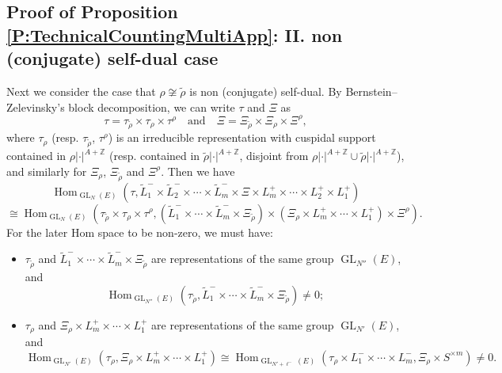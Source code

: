 \documentclass[11pt,letterpaper]{amsart}
\theoremstyle{plain}
\numberwithin{theorem}{section}
\numberwithin{equation}{subsection}
\theoremstyle{remark}
\newcommand{\Hom}{\operatorname{Hom}}
\newcommand{\GL}{\operatorname{GL}}
\newcommand{\Z}{\mathbb{Z}}
\begin{document}
\vskip 5pt


\subsection{Proof of Proposition \ref{P:TechnicalCountingMultiApp}: II. non (conjugate) self-dual case} %
\label{sub:proof_of_proposition_p:technicalcountingmultiapp_ii_non_conjugate_self_dual_case}

Next we consider the case that $\rho\not\cong\widetilde{\rho}$ is non (conjugate) self-dual. By Bernstein--Zelevinsky's block decomposition, we can write $\tau$ and $\Xi$ as
\[
    \tau = \tau_{\widetilde{\rho}}\times\tau_\rho\times\tau^\rho \quad \text{and} \quad \Xi = \Xi_{\widetilde{\rho}}\times\Xi_\rho\times \Xi^\rho,
\]
where $\tau_\rho$ (resp. $\tau_{\widetilde{\rho}}$, $\tau^\rho$) is an irreducible representation with cuspidal support contained in $\rho|\cdot|^{A+\Z}$ (resp. contained in $\widetilde{\rho}|\cdot|^{A+\Z}$, disjoint from $\rho|\cdot|^{A+\Z}\cup\widetilde{\rho}|\cdot|^{A+\Z}$), and similarly for $\Xi_\rho$, $\Xi_{\widetilde{\rho}}$ and $\Xi^\rho$. Then we have
\[
    \Hom_{\GL_N\left(E\right)}\left(\tau, \widetilde{L}^-_1\times\widetilde{L}^-_2\times\cdots\times\widetilde{L}^-_m\times\Xi\times L^+_m\times\cdots\times L_2^+\times L_1^+\right)
\]
\[
    \cong \Hom_{\GL_N\left(E\right)}\left(\tau_{\widetilde{\rho}}\times\tau_\rho\times\tau^\rho, \left(\widetilde{L}^-_1\times\cdots\times\widetilde{L}^-_m\times\Xi_{\widetilde{\rho}}\right)\times\left(\Xi_\rho\times L^+_m\times\cdots\times L_1^+\right)\times\Xi^\rho\right).
\]
For the later Hom space to be non-zero, we must have:
\begin{itemize}
    \item $\tau_{\widetilde{\rho}}$ and $\widetilde{L}^-_1\times\cdots\times\widetilde{L}^-_m\times\Xi_{\widetilde{\rho}}$ are representations of the same group $\GL_{N''}\left(E\right)$, and 
    \[
        \Hom_{\GL_{N''}\left(E\right)}\left(\tau_{\widetilde{\rho}},\widetilde{L}^-_1\times\cdots\times\widetilde{L}^-_m\times\Xi_{\widetilde{\rho}}\right)\neq 0;
    \]

    \vskip 5pt

    \item $\tau_\rho$ and $\Xi_\rho\times L^+_m\times\cdots\times L_1^+$ are representations of the same group $\GL_{N'}\left(E\right)$, and 
    \[
        \Hom_{\GL_{N'}\left(E\right)}\left(\tau_\rho,\Xi_\rho\times L^+_m\times\cdots\times L_1^+\right)\cong\Hom_{\GL_{N'+\ell^-}\left(E\right)}\left(\tau_\rho\times L^-_1\times\cdots\times L^-_m, \Xi_\rho\times S^{\times m}\right)\neq 0.
    \]
\end{itemize}
\end{document}
